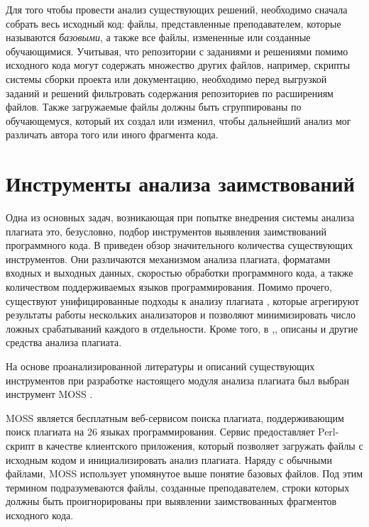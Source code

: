 \documentclass[a4paper,14pt]{extarticle}
\begin{document}
Для того чтобы провести анализ существующих решений, необходимо сначала собрать весь исходный код: файлы, представленные преподавателем, которые называются \textit{базовыми}, а также все файлы, измененные или созданные обучающимися. Учитывая, что репозитории с заданиями и решениями помимо исходного кода могут содержать множество других файлов, например, скрипты системы сборки проекта или документацию, необходимо перед выгрузкой заданий и решений фильтровать содержания репозиториев по расширениям файлов. Также загружаемые файлы должны быть сгруппированы по обучающемуся, который их создал или изменил, чтобы дальнейший анализ мог различать автора того или иного фрагмента кода. 

\section{Инструменты анализа заимствований}

Одна из основных задач, возникающая при попытке внедрения системы анализа плагиата это, безусловно, подбор инструментов выявления заимствований программного кода. В \citep{plagiarismToolsSurvey} приведен обзор значительного количества существующих инструментов. Они различаются механизмом анализа плагиата, форматами входных и выходных данных, скоростью обработки программного кода, а также количеством поддерживаемых языков программирования. Помимо прочего, существуют унифицированные подходы к анализу плагиата \citep{unifiedPlagiarismDetectionTool}\citep{gitplagThesis}, которые агрегируют результаты работы нескольких анализаторов и позволяют минимизировать число ложных срабатываний каждого в отдельности. Кроме того, в \citep{codeStyleDetectionTool},\citep{anotherPlagAnalysisTool},\citep{languageIndependentPlagiarismTool} описаны и другие средства анализа плагиата.

На основе проанализированной литературы и описаний существующих инструментов при разработке настоящего модуля анализа плагиата был выбран инструмент MOSS \citep{mossOriginalPaper}.

MOSS является бесплатным веб-сервисом поиска плагиата, поддерживающим поиск плагиата на 26 языках программирования. Сервис предоставляет Perl-скрипт в качестве клиентского приложения, который позволяет загружать файлы с исходным кодом и инициализировать анализ плагиата. Наряду с обычными файлами, MOSS использует упомянутое выше понятие базовых файлов. Под этим термином подразумеваются файлы, созданные преподавателем, строки которых должны быть проигнорированы при выявлении заимствованных фрагментов исходного кода.
\end{document}
